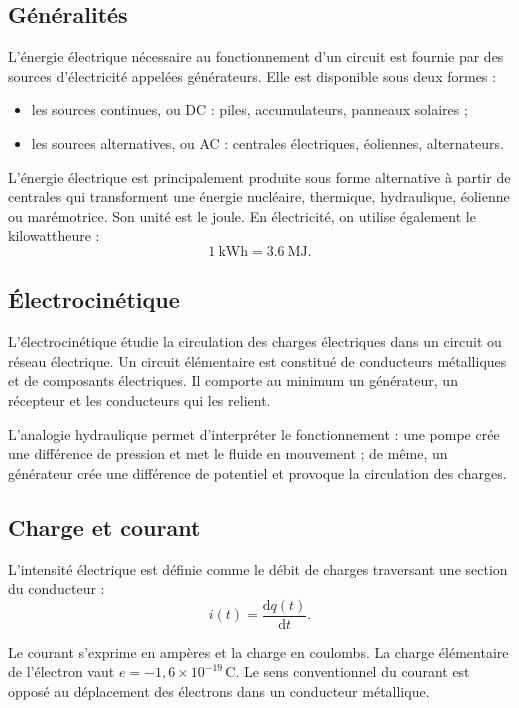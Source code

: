 \subsection{Généralités}

L'énergie électrique nécessaire au fonctionnement d'un circuit est fournie par des sources d'électricité appelées générateurs. Elle est disponible sous deux formes :
\begin{itemize}
  \item les sources continues, ou DC : piles, accumulateurs, panneaux solaires ;
  \item les sources alternatives, ou AC : centrales électriques, éoliennes, alternateurs.
\end{itemize}

L'énergie électrique est principalement produite sous forme alternative à partir de centrales qui transforment une énergie nucléaire, thermique, hydraulique, éolienne ou marémotrice. Son unité est le joule. En électricité, on utilise également le kilowattheure :
\[
\SI{1}{\kilo\watt\hour}=\SI{3.6}{\mega\joule}.
\]

\subsection{Électrocinétique}

L'électrocinétique étudie la circulation des charges électriques dans un circuit ou réseau électrique. Un circuit élémentaire est constitué de conducteurs métalliques et de composants électriques. Il comporte au minimum un générateur, un récepteur et les conducteurs qui les relient.

L'analogie hydraulique permet d'interpréter le fonctionnement : une pompe crée une différence de pression et met le fluide en mouvement ; de même, un générateur crée une différence de potentiel et provoque la circulation des charges.

\subsection{Charge et courant}

L'intensité électrique est définie comme le débit de charges traversant une section du conducteur :
\[
i(t)=\frac{\mathrm{d}q(t)}{\mathrm{d}t}.
\]

Le courant s'exprime en ampères et la charge en coulombs. La charge élémentaire de l'électron vaut $e=-1{,}6\times10^{-19}\,\si{\coulomb}$. Le sens conventionnel du courant est opposé au déplacement des électrons dans un conducteur métallique.

